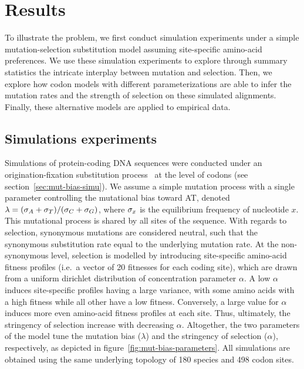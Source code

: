 \section{Results}
\label{sec:results}

To illustrate the problem, we first conduct simulation experiments under a simple mutation-selection substitution model assuming site-specific amino-acid preferences.
We use these simulation experiments to explore through summary statistics the intricate interplay between mutation and selection.
Then, we explore how codon models with different parameterizations are able to infer the mutation rates and the strength of selection on these simulated alignments.
Finally, these alternative models are applied to empirical data.

\subsection{Simulations experiments}
\label{subsec:simulations-experiments}

Simulations of protein-coding \acrshort{DNA} sequences were conducted under an origination-fixation substitution process~\citep{McCandlish2014} at the level of codons (see section~\ref{sec:mut-bias-simu}).
We assume a simple mutation process with a single parameter controlling the mutational bias toward AT, denoted $\lambda = (\sigma_A+\sigma_T)/(\sigma_C+\sigma_G)$, where $\sigma_x$ is the equilibrium frequency of nucleotide $x$.
This mutational process is shared by all sites of the sequence.
With regards to selection, synonymous mutations are considered neutral, such that the synonymous substitution rate equal to the underlying mutation rate.
At the non-synonymous level, selection is modelled by introducing site-specific amino-acid fitness profiles (i.e.~a vector of 20 fitnesses for each coding site), which are drawn from a uniform dirichlet distribution of concentration parameter $\alpha$.
A low $\alpha$ induces site-specific profiles having a large variance, with some amino acids with a high fitness while all other have a low fitness.
Conversely, a large value for $\alpha$ induces more even amino-acid fitness profiles at each site.
Thus, ultimately, the stringency of selection increase with decreasing $\alpha$.
Altogether, the two parameters of the model tune the mutation bias ($\lambda$) and the stringency of selection ($\alpha$), respectively, as depicted in figure~\ref{fig:mut-bias-parameters}.
All simulations are obtained using the same underlying topology of 180 species and 498 codon sites.

